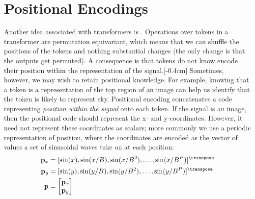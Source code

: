 



\section{Positional Encodings}\label{sec:transformers:positional_encodings}
Another idea associated with transformers is . Operations over tokens in a transformer are permutation equivariant, which means that we can shuffle the positions of the tokens and nothing substantial changes (the only change is that the outputs get permuted). A consequence is that tokens do not know encode their position within the representation of the signal.[-0.4cm] Sometimes, however, we may wish to retain positional knowledge. For example, knowing that a token is a representation of the top region of an image can help us identify that the token is likely to represent sky. Positional encoding concatenates a code representing \textit{position within the signal} onto each token. If the signal is an image, then the positional code should represent the x- and y-coordinates. However, it need not represent these coordinates as scalars; more commonly we use a periodic representation of position, where the coordinates are encoded as the vector of values a set of sinusoidal waves take on at each position:
\begin{align}
    \mathbf{p}_x & = [\sin(x), \sin(x/B), \sin(x/B^2), \ldots, \sin(x/B^P)]^\transpose \\
    \mathbf{p}_y & = [\sin(y), \sin(y/B), \sin(y/B^2), \ldots, \sin(y/B^P)]^\transpose \\
    \mathbf{p}   & = \begin{bmatrix}
                         \mathbf{p}_x \\
                         \mathbf{p}_y
                     \end{bmatrix}
\end{align}
